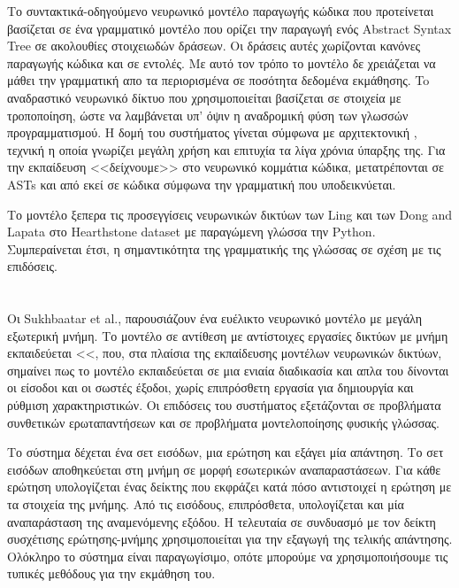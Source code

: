 Το συντακτικά-οδηγούμενο νευρωνικό μοντέλο παραγωγής κώδικα που προτείνεται βασίζεται σε ένα γραμματικό μοντέλο που ορίζει την παραγωγή ενός Abstract Syntax Tree σε ακολουθίες στοιχειωδών δράσεων.
Οι δράσεις αυτές χωρίζονται κανόνες παραγωγής κώδικα και σε εντολές.
Με αυτό τον τρόπο το μοντέλο δε χρειάζεται να μάθει την γραμματική απο τα περιορισμένα σε ποσότητα δεδομένα εκμάθησης.
To αναδραστικό νευρωνικό δίκτυο που χρησιμοποιείται βασίζεται σε στοιχεία  με τροποποίηση, ώστε να λαμβάνεται υπ' όψιν η αναδρομική φύση των γλωσσών προγραμματισμού.
Η δομή του συστήματος γίνεται σύμφωνα με αρχιτεκτονική  \cite{Bahdanau2014}, τεχνική η οποία γνωρίζει μεγάλη χρήση και επιτυχία τα λίγα χρόνια ύπαρξης της.
Για την εκπαίδευση <<δείχνουμε>> στο νευρωνικό κομμάτια κώδικα, μετατρέπονται σε ASTs και από εκεί σε κώδικα σύμφωνα την γραμματική που υποδεικνύεται.

Το μοντέλο ξεπερα τις  προσεγγίσεις νευρωνικών δικτύων των Ling και των Dong\cite{} and Lapata\cite{} στο Hearthstone dataset με παραγώμενη γλώσσα την Python.
Συμπεραίνεται έτσι, η σημαντικότητα της γραμματικής της γλώσσας σε σχέση με τις επιδόσεις. 

\section{}

Οι Sukhbaatar et al., παρουσιάζουν ένα ευέλικτο νευρωνικό μοντέλο με μεγάλη εξωτερική μνήμη. 
Το μοντέλο σε αντίθεση με αντίστοιχες εργασίες δικτύων με μνήμη εκπαιδεύεται <<, που, στα πλαίσια της εκπαίδευσης μοντέλων νευρωνικών δικτύων, σημαίνει πως το μοντέλο εκπαιδεύεται σε μια ενιαία διαδικασία και απλα του δίνονται οι είσοδοι και οι σωστές έξοδοι, χωρίς επιπρόσθετη εργασία για δημιουργία και ρύθμιση χαρακτηριστικών. Οι επιδόσεις του συστήματος εξετάζονται σε προβλήματα συνθετικών ερωταπαντήσεων και σε προβλήματα μοντελοποίησης φυσικής γλώσσας.

Το σύστημα δέχεται ένα σετ εισόδων, μια ερώτηση και εξάγει μία απάντηση. 
Το σετ εισόδων αποθηκεύεται στη μνήμη σε μορφή εσωτερικών αναπαραστάσεων. Για κάθε ερώτηση υπολογίζεται ένας δείκτης που εκφράζει κατά πόσο αντιστοιχεί η ερώτηση με τα στοιχεία της μνήμης.
Από τις εισόδους, επιπρόσθετα, υπολογίζεται και μία αναπαράσταση της αναμενόμενης εξόδου.
Η τελευταία σε συνδυασμό με τον δείκτη συσχέτισης ερώτησης-μνήμης χρησιμοποιείται για την εξαγωγή της τελικής απάντησης. Ολόκληρο το σύστημα είναι παραγωγίσιμο, οπότε μπορούμε να χρησιμοποιήσουμε τις τυπικές μεθόδους για την εκμάθηση του.

